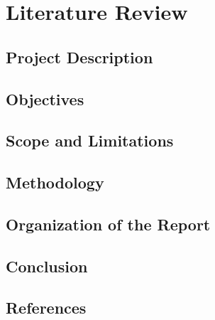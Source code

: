 \chapter{Literature Review}
\label{ch:introduction}

\section{Project Description}
\label{sec:project-description}



\section{Objectives}
\label{sec:objectives}



\section{Scope and Limitations}
\label{sec:scope-limitations}



\section{Methodology}
\label{sec:methodology}



\section{Organization of the Report}
\label{sec:organization-report}



\section{Conclusion}
\label{sec:conclusion}



\section*{References}
\label{sec:references}

